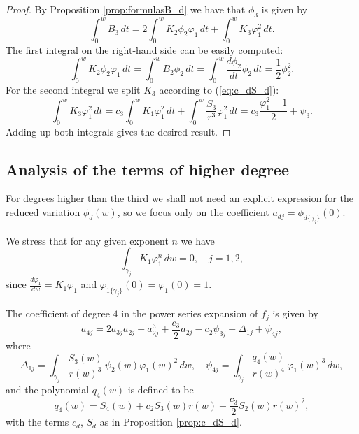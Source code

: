 \begin{proof}
By Proposition \ref{prop:formulasB_d} we have that $\phi_3$ is given by
\[ \int_0^w B_3\,dt=2\int_0^w K_2\phi_2\varphi_1\,dt+\int_0^w K_3\varphi_1^2\,dt. \]
The first integral on the right-hand side can be easily computed:
\[ \int_0^w K_2\phi_2\varphi_1\,dt=\int_0^w B_2\phi_2\,dt=\int_0^w\frac{d\phi_2}{dt}\phi_2\,dt=\frac{1}{2}\phi_2^2. \]
For the second integral we split $K_3$ according to (\ref{eq:c_dS_d}):
\[ \int_0^w K_3\varphi_1^2\,dt=c_3\int_0^wK_1\varphi_1^2\,dt+\int_0^w\frac{S_3}{r^3}\varphi_1^2\,dt=c_3\frac{\varphi_1^2-1}{2}+\psi_3. \]
Adding up both integrals gives the desired result. 
\end{proof}





\subsection{Analysis of the terms of higher degree}


For degrees higher than the third we shall not need an explicit expression for the reduced variation $\phi_d(w)$, so we focus only on the coefficient $a_{dj}=\phi_{d\{\gamma_j\}}(0)$. 

We stress that for any given exponent $n$ we have
\[ \int_{\gamma_j}K_1\varphi_1^n\,dw=0, \quad j=1,2, \]
since $\frac{d\varphi_1}{dw}=K_1\varphi_1$ and $\varphi_{1\{\gamma_j\}}(0)=\varphi_1(0)=1$.


\begin{proposition}\label{prop:fourthvar}
The coefficient of degree $4$ in the power series expansion of $f_j$ is given by
\[ a_{4j}=2a_{3j}a_{2j}-a_{2j}^3+\frac{c_3}{2}a_{2j}-c_2\psi_{3j}+\Delta_{1j}+\psi_{4j}, \]
where
\[ \Delta_{1j}=\int_{\gamma_j}\frac{S_3(w)}{r(w)^3}\,\psi_2(w)\varphi_1(w)^2\,dw, \quad \psi_{4j}=\int_{\gamma_j}\frac{q_4(w)}{r(w)^4}\,\varphi_1(w)^3\,dw,   \]
and the polynomial $q_4(w)$ is defined to be
\[ q_4(w)=S_4(w)+c_2S_3(w)r(w)-\frac{c_3}{2}S_2(w)r(w)^2, \]
with the terms $c_d$, $S_d$ as in Proposition \textnormal{\ref{prop:c_dS_d}}.
\end{proposition}

